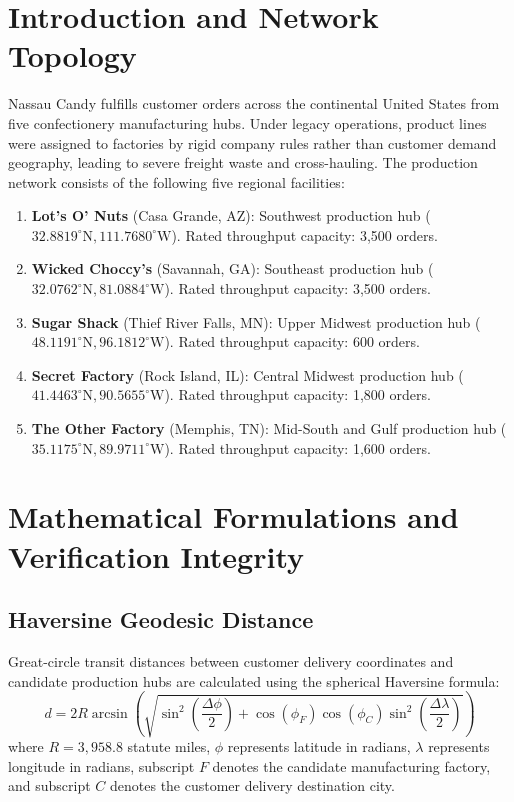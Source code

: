 \documentclass[12pt]{article}
\begin{document}
\section{Introduction and Network Topology}
Nassau Candy fulfills customer orders across the continental United States from five confectionery manufacturing hubs. Under legacy operations, product lines were assigned to factories by rigid company rules rather than customer demand geography, leading to severe freight waste and cross-hauling. The production network consists of the following five regional facilities:
\begin{enumerate}
    \item \textbf{Lot's O' Nuts} (Casa Grande, AZ): Southwest production hub ($32.8819^\circ\text{N}, 111.7680^\circ\text{W}$). Rated throughput capacity: 3,500 orders.
    \item \textbf{Wicked Choccy's} (Savannah, GA): Southeast production hub ($32.0762^\circ\text{N}, 81.0884^\circ\text{W}$). Rated throughput capacity: 3,500 orders.
    \item \textbf{Sugar Shack} (Thief River Falls, MN): Upper Midwest production hub ($48.1191^\circ\text{N}, 96.1812^\circ\text{W}$). Rated throughput capacity: 600 orders.
    \item \textbf{Secret Factory} (Rock Island, IL): Central Midwest production hub ($41.4463^\circ\text{N}, 90.5655^\circ\text{W}$). Rated throughput capacity: 1,800 orders.
    \item \textbf{The Other Factory} (Memphis, TN): Mid-South and Gulf production hub ($35.1175^\circ\text{N}, 89.9711^\circ\text{W}$). Rated throughput capacity: 1,600 orders.
\end{enumerate}

\newpage
\section{Mathematical Formulations and Verification Integrity}

\subsection{Haversine Geodesic Distance}
Great-circle transit distances between customer delivery coordinates and candidate production hubs are calculated using the spherical Haversine formula:
\[
d = 2 R \arcsin\left( \sqrt{\sin^2\left(\frac{\Delta\phi}{2}\right) + \cos(\phi_F)\cos(\phi_C)\sin^2\left(\frac{\Delta\lambda}{2}\right)} \right)
\]
where $R = 3{,}958.8$ statute miles, $\phi$ represents latitude in radians, $\lambda$ represents longitude in radians, subscript $F$ denotes the candidate manufacturing factory, and subscript $C$ denotes the customer delivery destination city.
\end{document}
